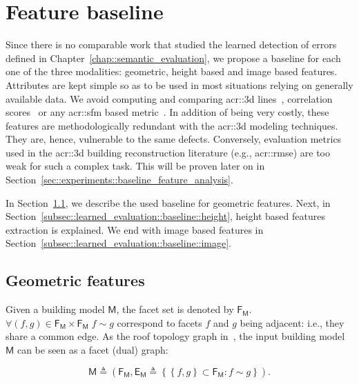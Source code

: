 \section{Feature baseline}
    \label{sec::learned_evaluation::baseline}
    Since there is no comparable work that studied the learned detection of errors defined in Chapter~\ref{chap::semantic_evaluation}, we propose a baseline for each one of the three modalities: geometric, height based and image based features.
    Attributes are kept simple so as to be used in most situations relying on generally available data.
    We avoid computing and comparing \gls{acr::3d} lines~\parencite{michelin2013quality}, correlation scores~\parencite{boudet2006supervised} or any \gls{acr::sfm} based metric~\parencite{kowdle2011active}.
    In addition of being very costly, these features are methodologically redundant with the \gls{acr::3d} modeling techniques.
    They are, hence, vulnerable to the same defects.
    Conversely, evaluation metrics used in the \gls{acr::3d} building reconstruction literature (e.g., \gls{acr::rmse}) are too weak for such a complex task.
    This will be proven later on in Section~\ref{sec::experiments::baseline_feature_analysis}.

    In Section~\ref{subsec::learned_evaluation::baseline::geometric}, we describe the used baseline for geometric features.
    Next, in Section~\ref{subsec::learned_evaluation::baseline::height}, height based features extraction is explained.
    We end with image based features in Section~\ref{subsec::learned_evaluation::baseline::image}.

    \subsection{Geometric features}
        \label{subsec::learned_evaluation::baseline::geometric}
        Given a building model \(\mathsf{M}\), the facet set is denoted by $\mathsf{F_M}$.
        $\forall (f, g) \in \mathsf{F_M} \times \mathsf{F_M} \; f \sim g$ correspond to facets \(f\) and \(g\) being adjacent: 
        i.e., they share a common edge. As the roof topology graph in~\parencite{verma20063d}, the input building model $\mathsf{M}$ can be seen as a facet (dual) graph:

        \begin{equation}
        	\label{eq::model_graph}
        	\mathsf{M} \triangleq \left(\mathsf{F_M}, \mathsf{E_M} \triangleq \left\{ \left\{f, g\right\} \subset \mathsf{F_M} : f \sim g \right\} \right).
        \end{equation}

